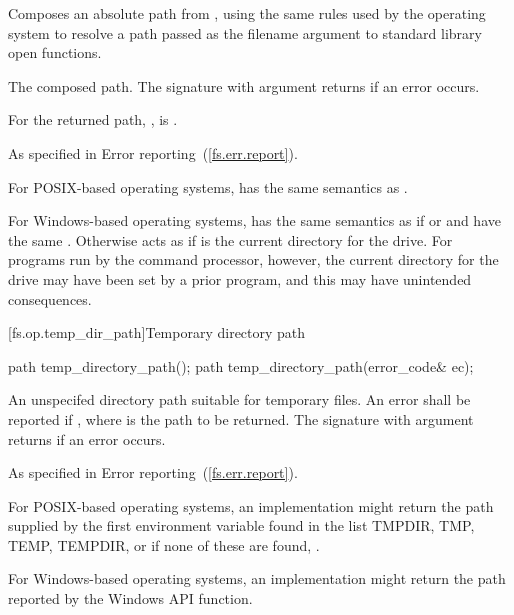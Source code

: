 \begin{itemdescr}
\pnum
\effects Composes an absolute path from , using the
  same rules used by the operating system to resolve a path passed as the
  filename argument to standard library open functions.

\pnum
\returns The composed path. The signature with argument 
  returns  if an error occurs.

\pnum
\postcondition For the returned path, ,  is .

\pnum
\throws As specified in Error reporting~(\ref{fs.err.report}).

\pnum
\begin{example} For POSIX-based operating systems, 
  has the same semantics as .

\pnum
For Windows-based operating systems,  has the
  same semantics as  if
   or
   and  have the same .
  Otherwise  acts as if  is
  the current directory for the  drive.
  For programs run by the command processor, however, the current directory
  for the  drive may have been set by a prior program,
  and this may have unintended consequences.
\end{example}

\end{itemdescr}

[fs.op.temp_dir_path]{Temporary directory path}

%
\begin{itemdecl}
path temp_directory_path();
path temp_directory_path(error_code& ec);
\end{itemdecl}

\begin{itemdescr}
\pnum
\returns An unspecifed directory path suitable for temporary files. An error shall be reported if
, where  is the path to be returned.
  The signature with argument  returns  if an
  error occurs.

\pnum
\throws As specified in Error reporting~(\ref{fs.err.report}).

\pnum
\begin{example} For POSIX-based operating systems, an implementation might
  return the path
  supplied by the first environment variable found in the list TMPDIR, TMP, TEMP, TEMPDIR,
  or if none of these are found, .

\pnum
For Windows-based operating systems, an implementation might return the path
  reported by the Windows  API function.
\end{example}
\end{itemdescr}

